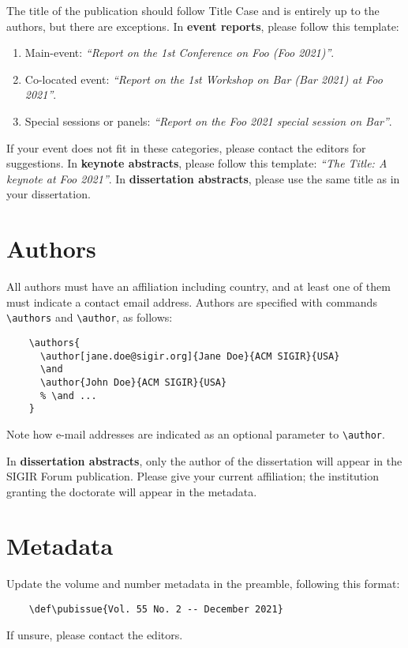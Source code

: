 \documentclass[news]{sigirforum}
\def\pubissue{v1.1.1 -- October 2022}
\begin{document}
The title of the publication should follow Title Case and is entirely up to the authors, but there are exceptions. In \textbf{event reports}, please follow this template:
\begin{enumerate}
	\item Main-event: \textsl{``Report on the 1st Conference on Foo (Foo 2021)''}.
	\item Co-located event: \textsl{``Report on the 1st Workshop on Bar (Bar 2021) at Foo 2021''}.
	\item Special sessions or panels: \textsl{``Report on the Foo 2021 special session on Bar''}.
\end{enumerate}

If your event does not fit in these categories, please contact the editors for suggestions. In \textbf{keynote abstracts}, please follow this template: \textsl{``The Title: A keynote at Foo 2021''}. In \textbf{dissertation abstracts}, please use the same title as in your dissertation.

\section{Authors}

All authors must have an affiliation including country, and at least one of them must indicate a contact email address. Authors are specified with commands \texttt{\textbackslash authors} and \texttt{\textbackslash author}, as follows:
\begin{verbatim}
    \authors{
      \author[jane.doe@sigir.org]{Jane Doe}{ACM SIGIR}{USA}
      \and
      \author{John Doe}{ACM SIGIR}{USA}
      % \and ...
    }
\end{verbatim}
Note how e-mail addresses are indicated as an optional parameter to \texttt{\textbackslash author}.

In \textbf{dissertation abstracts}, only the author of the dissertation will appear in the SIGIR Forum publication. Please give your current affiliation; the institution granting the doctorate will appear in the metadata.

\section{Metadata}

Update the volume and number metadata in the preamble, following this format:
\begin{verbatim}
    \def\pubissue{Vol. 55 No. 2 -- December 2021}
\end{verbatim}
If unsure, please contact the editors.
\end{document}
